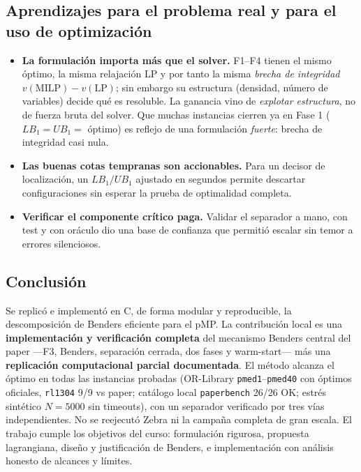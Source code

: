 \subsection{Aprendizajes para el problema real y para el uso de optimización}
\begin{itemize}[noitemsep]
  \item \textbf{La formulación importa más que el solver.} F1--F4 tienen el mismo óptimo, la misma
        relajación LP y por tanto la misma \emph{brecha de integridad}
        $v(\text{MILP})-v(\text{LP})$; sin embargo su estructura (densidad, número de variables)
        decide qué es resoluble. La ganancia vino de \emph{explotar estructura}, no de fuerza
        bruta del solver. Que muchas instancias cierren ya en Fase 1 ($LB_1=UB_1=$ óptimo) es
        reflejo de una formulación \emph{fuerte}: brecha de integridad casi nula.
  \item \textbf{Las buenas cotas tempranas son accionables.} Para un decisor de localización, un
        $LB_1/UB_1$ ajustado en segundos permite descartar configuraciones sin esperar la prueba
        de optimalidad completa.
  \item \textbf{Verificar el componente crítico paga.} Validar el separador a mano, con test y con
        oráculo dio una base de confianza que permitió escalar sin temor a errores silenciosos.
\end{itemize}

\subsection{Conclusión}
Se replicó e implementó en C, de forma modular y reproducible, la descomposición de Benders
eficiente para el pMP. La contribución local es una \textbf{implementación y verificación completa} del
mecanismo Benders central del paper —F3, Benders, separación cerrada, dos fases y warm-start— más una
\textbf{replicación computacional parcial documentada}. El método alcanza el óptimo en todas las
instancias probadas (OR-Library \texttt{pmed1}--\texttt{pmed40} con óptimos oficiales,
\texttt{rl1304} 9/9 vs paper; catálogo local \texttt{paperbench} 26/26 OK; estrés sintético
$N=5000$ sin timeouts), con un separador verificado por tres vías independientes. No se
reejecutó Zebra ni la campaña completa de gran escala. El trabajo cumple los objetivos del curso:
formulación rigurosa, propuesta lagrangiana, diseño y justificación de Benders, e implementación
con análisis honesto de alcances y límites.
